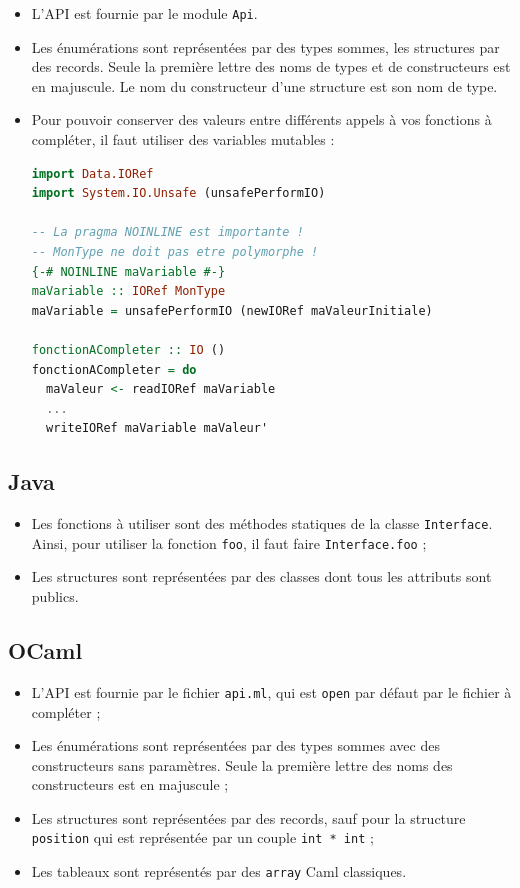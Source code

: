 \begin{itemize}
\item{L'API est fournie par le module \texttt{Api}.}
\item{Les énumérations sont représentées par des types sommes, les structures
      par des records. Seule la première lettre des noms de types et de
      constructeurs est en majuscule. Le nom du constructeur d'une structure
      est son nom de type.}
\item{Pour pouvoir conserver des valeurs entre différents appels à vos fonctions
      à compléter, il faut utiliser des variables mutables :}
\begin{lstlisting}[language=Haskell]
import Data.IORef
import System.IO.Unsafe (unsafePerformIO)

-- La pragma NOINLINE est importante !
-- MonType ne doit pas etre polymorphe !
{-# NOINLINE maVariable #-}
maVariable :: IORef MonType
maVariable = unsafePerformIO (newIORef maValeurInitiale)

fonctionACompleter :: IO ()
fonctionACompleter = do
  maValeur <- readIORef maVariable
  ...
  writeIORef maVariable maValeur'

\end{lstlisting}
\end{itemize}

\subsection{Java}

\begin{itemize}
\item{Les fonctions à utiliser sont des méthodes statiques de la classe
      \texttt{Interface}. Ainsi, pour utiliser la fonction \texttt{foo}, il
      faut faire \texttt{Interface.foo} ;}
\item{Les structures sont représentées par des classes dont tous les attributs
      sont publics.}
\end{itemize}

\subsection{OCaml}

\begin{itemize}
\item{L'API est fournie par le fichier \texttt{api.ml}, qui est \texttt{open}
      par défaut par le fichier à compléter ;}
\item{Les énumérations sont représentées par des types sommes avec des
      constructeurs sans paramètres. Seule la première lettre des noms des
      constructeurs est en majuscule ;}
\item{Les structures sont représentées par des records, sauf pour la structure
      \texttt{position} qui est représentée par un couple \texttt{int * int} ;}
\item{Les tableaux sont représentés par des \texttt{array} Caml classiques.}
\end{itemize}

